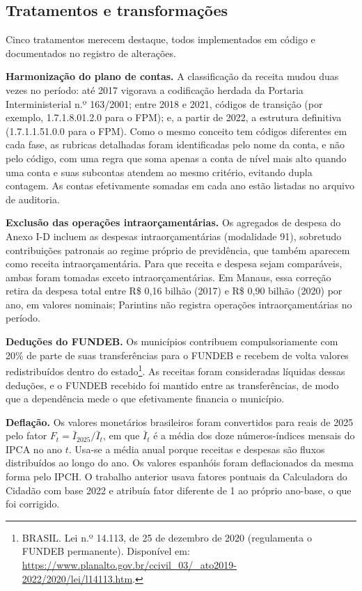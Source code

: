 \subsection{Tratamentos e transformações}\label{sec:tratamentos}

Cinco tratamentos merecem destaque, todos implementados em código e documentados no registro de alterações.

\textbf{Harmonização do plano de contas.} A classificação da receita mudou duas vezes no período: até 2017 vigorava a codificação herdada da Portaria Interministerial n.º 163/2001; entre 2018 e 2021, códigos de transição (por exemplo, 1.7.1.8.01.2.0 para o FPM); e, a partir de 2022, a estrutura definitiva (1.7.1.1.51.0.0 para o FPM). Como o mesmo conceito tem códigos diferentes em cada fase, as rubricas detalhadas foram identificadas pelo nome da conta, e não pelo código, com uma regra que soma apenas a conta de nível mais alto quando uma conta e suas subcontas atendem ao mesmo critério, evitando dupla contagem. As contas efetivamente somadas em cada ano estão listadas no arquivo de auditoria.

\textbf{Exclusão das operações intraorçamentárias.} Os agregados de despesa do Anexo I-D incluem as despesas intraorçamentárias (modalidade 91), sobretudo contribuições patronais ao regime próprio de previdência, que também aparecem como receita intraorçamentária. Para que receita e despesa sejam comparáveis, ambas foram tomadas exceto intraorçamentárias. Em Manaus, essa correção retira da despesa total entre R\$ 0,16 bilhão (2017) e R\$ 0,90 bilhão (2020) por ano, em valores nominais; Parintins não registra operações intraorçamentárias no período.

\textbf{Deduções do FUNDEB.} Os municípios contribuem compulsoriamente com 20\% de parte de suas transferências para o FUNDEB e recebem de volta valores redistribuídos dentro do estado\footnote{BRASIL. Lei n.º 14.113, de 25 de dezembro de 2020 (regulamenta o FUNDEB permanente). Disponível em: \url{https://www.planalto.gov.br/ccivil_03/_ato2019-2022/2020/lei/l14113.htm}.}. As receitas foram consideradas líquidas dessas deduções, e o FUNDEB recebido foi mantido entre as transferências, de modo que a dependência mede o que efetivamente financia o município.

\textbf{Deflação.} Os valores monetários brasileiros foram convertidos para reais de 2025 pelo fator $F_t = \bar I_{2025}/\bar I_t$, em que $\bar I_t$ é a média dos doze números-índices mensais do IPCA no ano $t$. Usa-se a média anual porque receitas e despesas são fluxos distribuídos ao longo do ano. Os valores espanhóis foram deflacionados da mesma forma pelo IPCH. O trabalho anterior usava fatores pontuais da Calculadora do Cidadão com base 2022 e atribuía fator diferente de 1 ao próprio ano-base, o que foi corrigido.


